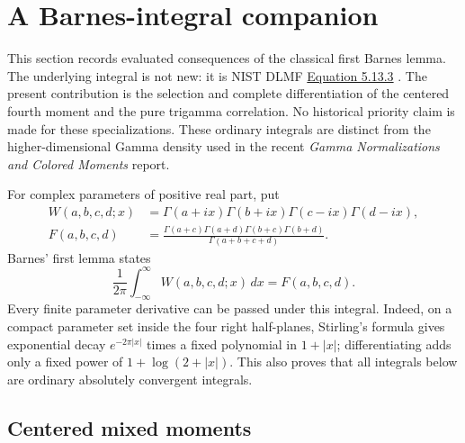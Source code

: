
\section{A Barnes-integral companion}
\label{bim:section}

This section records evaluated consequences of the classical first Barnes
lemma.  The underlying integral is not new: it is NIST DLMF
\href{https://dlmf.nist.gov/5.13.E3}{Equation 5.13.3} \cite{DLMF}.  The present
contribution is the selection and complete differentiation of the
centered fourth moment and the pure trigamma correlation.  No historical priority claim is made for these specializations.  These ordinary integrals are
distinct from the higher-dimensional Gamma density used in the recent
\emph{Gamma Normalizations and Colored Moments} report.

For complex parameters of positive real part, put
\begin{align}
 W(a,b,c,d;x)&=\Gamma(a+ix)\Gamma(b+ix)
                  \Gamma(c-ix)\Gamma(d-ix),\\
 F(a,b,c,d)&=\frac{\Gamma(a+c)\Gamma(a+d)
                       \Gamma(b+c)\Gamma(b+d)}
                      {\Gamma(a+b+c+d)}.
\end{align}
Barnes' first lemma states
\begin{equation}\label{bim:barnes}
 \frac1{2\pi}\int_{-\infty}^{\infty}W(a,b,c,d;x)\,dx
                              =F(a,b,c,d).
\end{equation}
Every finite parameter derivative can be passed under this integral.
Indeed, on a compact parameter set inside the four right half-planes,
Stirling's formula gives exponential decay $e^{-2\pi|x|}$ times a
fixed polynomial in $1+|x|$; differentiating adds only a fixed power of
$1+\log(2+|x|)$.  This also proves that all integrals below are ordinary
absolutely convergent integrals.

\subsection{Centered mixed moments}

